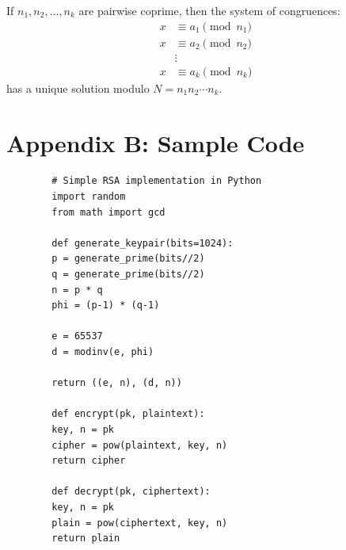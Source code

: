 	If $n_1, n_2, \ldots, n_k$ are pairwise coprime, then the system of congruences:
	\begin{align*}
		x &\equiv a_1 \pmod{n_1} \\
		x &\equiv a_2 \pmod{n_2} \\
		&\vdots \\
		x &\equiv a_k \pmod{n_k}
	\end{align*}
	has a unique solution modulo $N = n_1 n_2 \cdots n_k$.
	
	\section{Appendix B: Sample Code}
	
	\begin{verbatim}
		# Simple RSA implementation in Python
		import random
		from math import gcd
		
		def generate_keypair(bits=1024):
		p = generate_prime(bits//2)
		q = generate_prime(bits//2)
		n = p * q
		phi = (p-1) * (q-1)
		
		e = 65537
		d = modinv(e, phi)
		
		return ((e, n), (d, n))
		
		def encrypt(pk, plaintext):
		key, n = pk
		cipher = pow(plaintext, key, n)
		return cipher
		
		def decrypt(pk, ciphertext):
		key, n = pk
		plain = pow(ciphertext, key, n)
		return plain
	\end{verbatim}
	